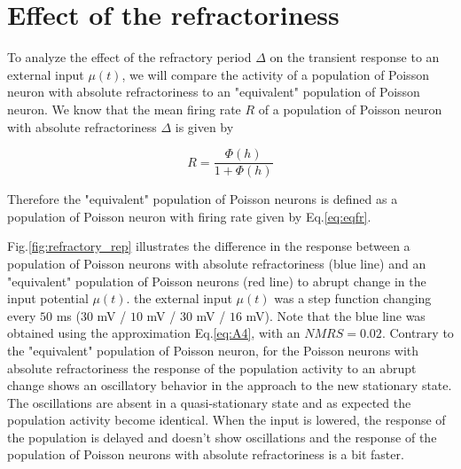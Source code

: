 \documentclass[12pt,twoside]{report}
\begin{document}
\section{Effect of the refractoriness}

To analyze the effect of the refractory period $\Delta$ on the transient response to an external input $\mu(t)$, we will compare the activity of a population of Poisson neuron with absolute refractoriness to an "equivalent" population of Poisson neuron. We know that the mean firing rate $R$ of a population of Poisson neuron with absolute refractoriness $\Delta$ is given by 

\begin{equation}
\label{eq:eqfr}
R=\frac{\Phi(h)}{1+\Phi(h)}
\end{equation}

Therefore the "equivalent" population of Poisson neurons is defined as a population of Poisson neuron with firing rate given by Eq.\eqref{eq:eqfr}.


Fig.\ref{fig:refractory_rep} illustrates the difference in the response between a population of Poisson neurons with absolute refractoriness (blue line) and an "equivalent" population of Poisson neurons (red line) to abrupt change in the input potential $\mu(t)$. the external input $\mu(t)$ was a step function changing every $50$ ms ($30$ mV / $10$ mV / $30$ mV / $16$ mV). Note that the blue line was obtained using the approximation Eq.\eqref{eq:A4}, with an $NMRS=0.02$. Contrary to the "equivalent" population of Poisson neuron, for the Poisson neurons with absolute refractoriness the response of the population activity to an abrupt change shows an oscillatory behavior in the approach to the new stationary state. The oscillations are absent in a quasi-stationary state and as expected the population activity become identical. When the input is lowered, the response of the population is delayed and doesn't show oscillations and the response of the population of Poisson neurons with absolute refractoriness is a bit faster.
\end{document}
